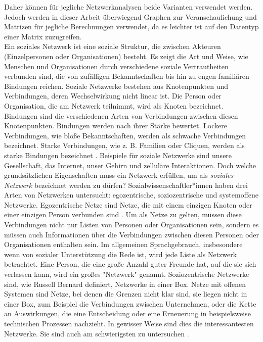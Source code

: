 Daher können für jegliche Netzwerkanalysen beide Varianten verwendet werden. Jedoch werden in dieser Arbeit überwiegend Graphen zur Veranschaulichung und Matrizen für jegliche Berechnungen verwendet, da es leichter ist auf den Datentyp einer Matrix zuzugreifen.\\

Ein soziales Netzwerk ist eine soziale Struktur, die zwischen Akteuren (Einzelpersonen oder Organisationen) besteht. Es zeigt die Art und Weise, wie Menschen und Organisationen durch verschiedene soziale Vertrautheiten verbunden sind, die von zufälligen Bekanntschaften bis hin zu engen familiären Bindungen reichen. Soziale Netzwerke bestehen aus Knotenpunkten und Verbindungen, deren Wechselwirkung nicht linear ist. Die Person oder Organisation, die am Netzwerk teilnimmt, wird als Knoten bezeichnet. Bindungen sind die verschiedenen Arten von Verbindungen zwischen diesen Knotenpunkten. Bindungen werden nach ihrer Stärke bewertet. Lockere Verbindungen, wie bloße Bekanntschaften, werden als schwache Verbindungen bezeichnet. Starke Verbindungen, wie z. B. Familien oder Cliquen, werden als starke Bindungen bezeichnet \cite{SNADefinition}. Beispiele für soziale Netzwerke sind unsere Gesellschaft, das Internet, unser Gehirn und zelluläre Interaktionen.
Doch welche grundsätzlichen Eigenschaften muss ein Netzwerk erfüllen, um als \textit{soziales Netzwerk} bezeichnet werden zu dürfen? 
Sozialwissenschaftler*innen haben drei Arten von Netzwerken untersucht: egozentrische, soziozentrische und systemoffene
Netzwerke. Egozentrische Netze sind Netze, die mit einem einzigen Knoten oder einer einzigen Person verbunden sind \cite{egocentric}. Um als Netze zu gelten, müssen diese Verbindungen nicht nur Listen von Personen oder Organisationen sein, sondern es müssen auch Informationen über die Verbindungen zwischen diesen Personen oder Organisationen enthalten sein. Im allgemeinen Sprachgebrauch, insbesondere wenn von sozialer Unterstützung die Rede ist, wird jede Liste als Netzwerk betrachtet. Eine Person, die eine große Anzahl guter Freunde hat, auf die sie sich verlassen kann, wird ein großes "Netzwerk" genannt. Soziozentrische Netzwerke sind, wie Russell Bernard definiert, Netzwerke in einer Box. Netze mit offenen Systemen sind Netze, bei denen die Grenzen nicht klar sind, sie liegen nicht in einer Box, zum Beispiel die Verbindungen zwischen Unternehmen, oder die Kette an Auswirkungen, die eine Entscheidung oder eine Erneuerung in beispielsweise technischen Prozessen nachzieht. In gewisser Weise sind dies die interessantesten Netzwerke. Sie sind auch am schwierigsten zu untersuchen \cite{charlesKadushin}. 




